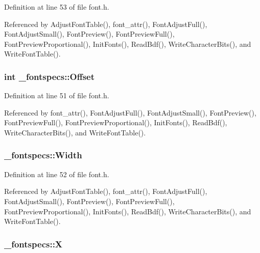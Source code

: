 Definition at line 53 of file font.\-h.



Referenced by Adjust\-Font\-Table(), font\-\_\-attr(), Font\-Adjust\-Full(), Font\-Adjust\-Small(), Font\-Preview(), Font\-Preview\-Full(), Font\-Preview\-Proportional(), Init\-Fonts(), Read\-Bdf(), Write\-Character\-Bits(), and Write\-Font\-Table().

\hypertarget{struct__fontspecs_ad4ef5755b58ecd3bbc9894cee258091e}{
\subsubsection[{Offset}]{\setlength{\rightskip}{0pt plus 5cm}int \-\_\-fontspecs\-::\-Offset}}\label{struct__fontspecs_ad4ef5755b58ecd3bbc9894cee258091e}


Definition at line 51 of file font.\-h.



Referenced by font\-\_\-attr(), Font\-Adjust\-Full(), Font\-Adjust\-Small(), Font\-Preview(), Font\-Preview\-Full(), Font\-Preview\-Proportional(), Init\-Fonts(), Read\-Bdf(), Write\-Character\-Bits(), and Write\-Font\-Table().

\hypertarget{struct__fontspecs_a8404888a24a2b065d91c4424e1907439}{
\subsubsection[{Width}]{ \-\_\-fontspecs\-::\-Width}}\label{struct__fontspecs_a8404888a24a2b065d91c4424e1907439}


Definition at line 52 of file font.\-h.



Referenced by Adjust\-Font\-Table(), font\-\_\-attr(), Font\-Adjust\-Full(), Font\-Adjust\-Small(), Font\-Preview(), Font\-Preview\-Full(), Font\-Preview\-Proportional(), Init\-Fonts(), Read\-Bdf(), Write\-Character\-Bits(), and Write\-Font\-Table().

\hypertarget{struct__fontspecs_a7273a891c79308389718266cb0b66f56}{
\subsubsection[{X}]{ \-\_\-fontspecs\-::\-X}}\label{struct__fontspecs_a7273a891c79308389718266cb0b66f56}


